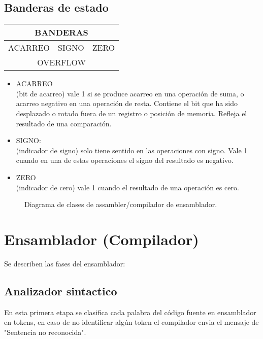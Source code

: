 \documentclass[conference]{IEEEtran}
\begin{document}
            \subsection{Banderas de estado}
            \begin{table}[h]
            \begin{tabular}{|c|l|l|}
            \hline
            \multicolumn{3}{|c|}{BANDERAS}               \\ \hline
            \multicolumn{1}{|l|}{ACARREO} & SIGNO & ZERO \\ \hline
            \multicolumn{3}{|c|}{OVERFLOW}               \\ \hline
            \end{tabular}
            \end{table}

            \begin{itemize}
                \item ACARREO\\
                (bit de acarreo) vale 1 si se produce acarreo en una operación de suma, o acarreo negativo en
                una operación de resta. Contiene el bit que ha sido desplazado o rotado fuera de un registro o
                posición de memoria. Refleja el resultado de una comparación. 
                \item SIGNO: \\
                (indicador de signo) solo tiene sentido en las operaciones con signo. Vale 1 cuando en una de
                estas operaciones el signo del resultado es negativo.    
                \item ZERO\\ 
                (indicador de cero) vale 1 cuando el resultado de una operación es cero. 

            \end{itemize}

\newpage
            \begin{figure*}
                \caption{Diagrama de clases de assambler/compilador de ensamblador.}
              \end{figure*}

\section{Ensamblador (Compilador)}
Se describen las fases del ensamblador:
\subsection{Analizador sintactico}
En esta primera etapa se clasifica cada palabra del código fuente en ensamblador en tokens, en caso de 
no identificar algún token el compilador envia el mensaje de "Sentencia no reconocida".
\end{document}

